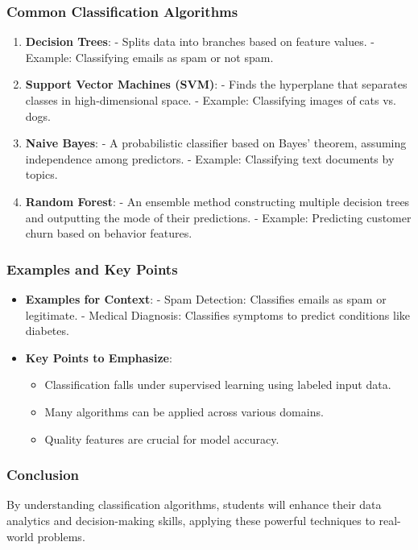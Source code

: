 \documentclass{beamer}
\begin{document}
\begin{frame}[fragile]
    \frametitle{Common Classification Algorithms}
    \begin{enumerate}
        \item \textbf{Decision Trees}: 
            - Splits data into branches based on feature values.
            - Example: Classifying emails as spam or not spam.
        \item \textbf{Support Vector Machines (SVM)}:
            - Finds the hyperplane that separates classes in high-dimensional space.
            - Example: Classifying images of cats vs. dogs.
        \item \textbf{Naive Bayes}:
            - A probabilistic classifier based on Bayes' theorem, assuming independence among predictors.
            - Example: Classifying text documents by topics.
        \item \textbf{Random Forest}:
            - An ensemble method constructing multiple decision trees and outputting the mode of their predictions.
            - Example: Predicting customer churn based on behavior features.
    \end{enumerate}
\end{frame}

\begin{frame}[fragile]
    \frametitle{Examples and Key Points}
    \begin{itemize}
        \item \textbf{Examples for Context}:
            - Spam Detection: Classifies emails as spam or legitimate.
            - Medical Diagnosis: Classifies symptoms to predict conditions like diabetes.
        \item \textbf{Key Points to Emphasize}:
            \begin{itemize}
                \item Classification falls under supervised learning using labeled input data.
                \item Many algorithms can be applied across various domains.
                \item Quality features are crucial for model accuracy.
            \end{itemize}
    \end{itemize}
\end{frame}

\begin{frame}[fragile]
    \frametitle{Conclusion}
    By understanding classification algorithms, students will enhance their data analytics and decision-making skills, applying these powerful techniques to real-world problems.
\end{frame}
\end{document}
